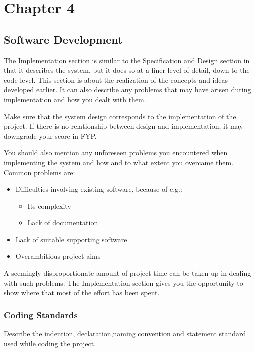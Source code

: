 


\setcounter{chapter}{4}
\setcounter{figure}{0}
\setcounter{table}{0}
\chapter*{Chapter 4}
\section{Software Development}

The Implementation section is similar to the Specification and Design section in that it describes the system, but it does so at a finer level of detail, down to the code level. This section is about the realization of the concepts and ideas developed earlier. It can also describe any problems that may have arisen during implementation and how you dealt with them.

Make sure that the system design corresponds to the implementation of the project. If there is no relationship between design and implementation, it may downgrade your score in FYP.

You should also mention any unforeseen problems you encountered when implementing the system and how and to what extent you overcame them. Common problems are:

\begin{itemize}
  \item Difficulties involving existing software, because of e.g.:
    \begin{itemize}
      \item Its complexity
      \item Lack of documentation
    \end{itemize}
  \item Lack of suitable supporting software
  \item Overambitious project aims
\end{itemize}



A seemingly disproportionate amount of project time can be taken up in dealing with such problems. The Implementation section gives you the opportunity to show where that most of the effort has been spent.

\subsection{Coding Standards}
Describe the indention, declaration,naming convention and statement standard used while coding the project.



